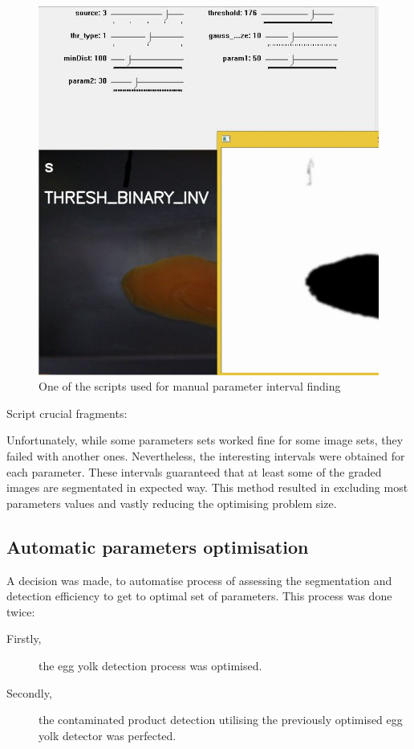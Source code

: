 \documentclass[12pt,twoside,a4paper]{article}
\begin{document}
\begin{figure}[H]
\centering
\includegraphics[width=0.5\paperwidth]{manual}
\caption{One of the scripts used for manual parameter interval finding}
\end{figure}

Script crucial fragments:


Unfortunately, while some parameters sets worked fine for some image sets, they failed with another ones.
Nevertheless, the interesting intervals were obtained for each parameter. These intervals guaranteed that at least some of the graded images are segmentated in expected way.
This method resulted in excluding most parameters values and vastly reducing the optimising problem size.

\subsection{Automatic parameters optimisation}

A decision was made, to automatise process of assessing the segmentation and detection efficiency to get to optimal set of parameters.
This process was done twice:
\begin{description}
\item[Firstly,] the egg yolk detection process was optimised.
\item[Secondly,] the contaminated product detection utilising the previously optimised egg yolk detector was perfected.
\end{description}
\end{document}
